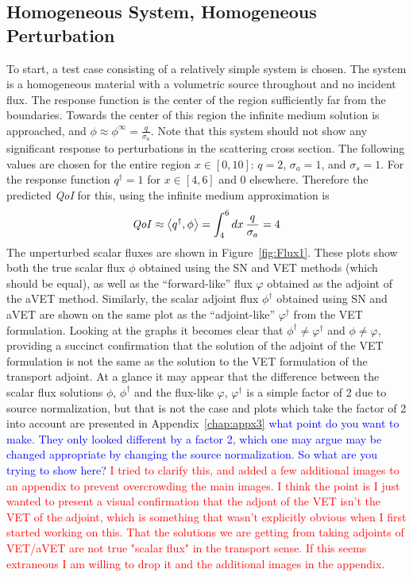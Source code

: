 \documentclass[12pt]{report}
\newcommand{\bra}{\left\langle}
\newcommand{\ket}{\right\rangle}
\newcommand{\sigs}{\sigma_s}
\newcommand{\siga}{\sigma_a}
\newcommand{\qoi}{{\it QoI}\xspace}
\newcommand{\comment}[2]{\marginpar{\textcolor{#2}{$\star$}}\textcolor{#2}{#1}\newline}
\newcommand{\iwh}[1]{\comment{#1}{red}}
\newcommand{\jcr}[1]{\comment{#1}{blue}}
\newcommand{\iwh}[1]{\phantom{a}}
\newcommand{\jcr}[1]{\phantom{a}}
\begin{document}
\subsection{Homogeneous System, Homogeneous Perturbation}
To start, a test case consisting of a relatively simple system is chosen. The system is a homogeneous material with a volumetric source throughout and no incident flux. The response function is the center of the region sufficiently far from the boundaries. Towards the center of this region the infinite medium solution is approached, and $\phi \approx \phi^\infty = \frac{q}{\siga}$. Note that this system should not show any significant response to perturbations in the scattering cross section. The following values are chosen for the entire region $x \in [0,10]$: $q=2$, $\siga=1$, and $\sigs=1$. For the response function $q^\dag=1$ for $x\in[4,6]$ and $0$ elsewhere. Therefore the predicted \qoi for this, using the infinite medium approximation is
\begin{equation}
\qoi \approx \bra q^\dag , \phi \ket = \int_4^6 dx \, \frac{q}{\siga} = 4
\end{equation}
The unperturbed scalar fluxes are shown in Figure~\ref{fig:Flux1}. These plots show both the true scalar flux $\phi$ obtained using the SN and VET methods (which should be equal), as well as the ``forward-like'' flux $\varphi$ obtained as the adjoint of the aVET method. Similarly, the scalar adjoint flux $\phi^\dag$ obtained using SN and aVET are shown on the same plot as the ``adjoint-like'' $\varphi^\dag$ from the VET formulation. Looking at the graphs it becomes clear that $\phi^\dag \neq \varphi^\dag$ and $\phi \neq \varphi$, providing a succinct confirmation that the solution of the adjoint of the VET formulation is not the same as the solution to the VET formulation of the transport adjoint. At a glance it may appear that the difference between the scalar flux solutions $\phi$, $\phi^\dag$ and the flux-like $\varphi$, $\varphi^\dag$ is a simple factor of 2 due to source normalization, but that is not the case and plots which take the factor of 2 into account are presented in Appendix~\ref{chap:appx3}
\jcr{what point do you want to make. They only looked different by a factor 2, which one may argue may be changed appropriate by changing the source normalization. So what are you trying to show here?}
\iwh{I tried to clarify this, and added a few additional images to an appendix to prevent overcrowding the main images. I think the point is I just wanted to present a visual confirmation that the adjont of the VET isn't the VET of the adjoint, which is something that wasn't explicitly obvious when I first started working on this. That the solutions we are getting from taking adjoints of VET/aVET are not true "scalar flux" in the transport sense. If this seems extraneous I am willing to drop it and the additional images in the appendix.}
\end{document}
